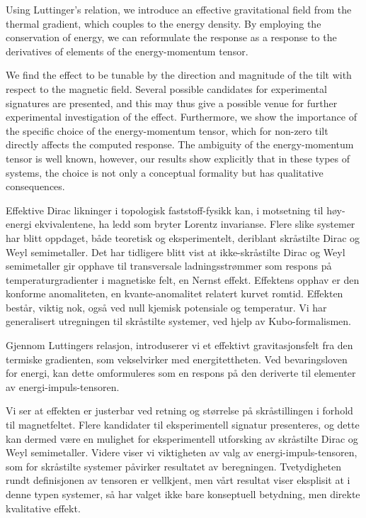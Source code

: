 Using Luttinger's relation, we introduce an effective gravitational field from the thermal gradient, which couples to the energy density.
By employing the conservation of energy, we can reformulate the response as a response to the derivatives of elements of the energy-momentum tensor.

We find the effect to be tunable by the direction and magnitude of the tilt with respect to the magnetic field.
Several possible candidates for experimental signatures are presented, and this may thus give a possible venue for further experimental investigation of the effect.
Furthermore, we show the importance of the specific choice of the energy-momentum tensor, which for non-zero tilt directly affects the computed response.
The ambiguity of the energy-momentum tensor is well known, however, our results show explicitly that in these types of systems, the choice is not only a conceptual formality but has qualitative consequences.

Effektive Dirac likninger i topologisk faststoff-fysikk kan, i motsetning til høy-energi ekvivalentene, ha ledd som bryter Lorentz invarianse.
Flere slike systemer har blitt oppdaget, både teoretisk og eksperimentelt, deriblant skråstilte Dirac og Weyl semimetaller.
Det har tidligere blitt vist at ikke-skråstilte Dirac og Weyl semimetaller gir opphave til transversale ladningsstrømmer som respons på temperaturgradienter i magnetiske felt, en Nernst effekt.
Effektens opphav er den konforme anomaliteten, en kvante-anomalitet relatert kurvet romtid.
Effekten består, viktig nok, også ved null kjemisk potensiale og temperatur.
Vi har generalisert utregningen til skråstilte systemer, ved hjelp av Kubo-formalismen.

Gjennom Luttingers relasjon, introduserer vi et effektivt gravitasjonsfelt fra den termiske gradienten, som vekselvirker med energitettheten.
Ved bevaringsloven for energi, kan dette omformuleres som en respons på den deriverte til elementer av energi-impuls-tensoren.

Vi ser at effekten er justerbar ved retning og størrelse på skråstillingen i forhold til magnetfeltet.
Flere kandidater til eksperimentell signatur presenteres, og dette kan dermed være en mulighet for eksperimentell utforsking av skråstilte Dirac og Weyl semimetaller.
Videre viser vi viktigheten av valg av energi-impuls-tensoren, som for skråstilte systemer påvirker resultatet av beregningen.
Tvetydigheten rundt definisjonen av tensoren er vellkjent, men vårt resultat viser eksplisit at i denne typen systemer, så har valget ikke bare konseptuell betydning, men direkte kvalitative effekt.
